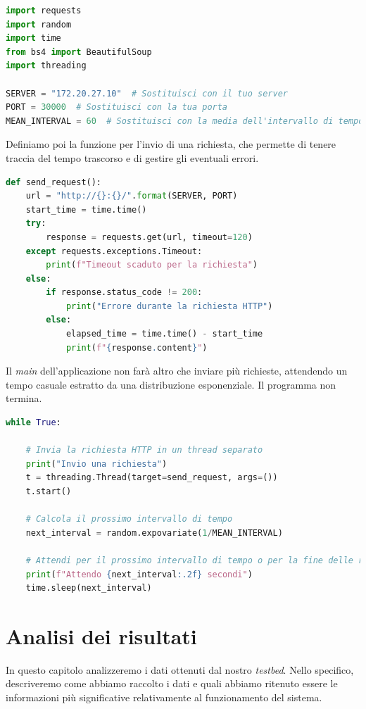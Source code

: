 \documentclass[12pt, hidelinks]{report}
\begin{document}
\begin{lstlisting}[language=Python]
import requests
import random
import time
from bs4 import BeautifulSoup
import threading

SERVER = "172.20.27.10"  # Sostituisci con il tuo server
PORT = 30000  # Sostituisci con la tua porta
MEAN_INTERVAL = 60  # Sostituisci con la media dell'intervallo di tempo tra una richiesta e l'altra
\end{lstlisting}

Definiamo poi la funzione per l'invio di una richiesta, che permette di tenere traccia del tempo trascorso e di gestire gli eventuali errori.

\begin{lstlisting}[language=Python]
def send_request():
    url = "http://{}:{}/".format(SERVER, PORT)
    start_time = time.time()
    try:
        response = requests.get(url, timeout=120)
    except requests.exceptions.Timeout:
        print(f"Timeout scaduto per la richiesta")
    else:
        if response.status_code != 200:
            print("Errore durante la richiesta HTTP")
        else:
            elapsed_time = time.time() - start_time
            print(f"{response.content}")
\end{lstlisting}

Il \textit{main} dell'applicazione non farà altro che inviare più richieste, attendendo un tempo casuale estratto da una distribuzione esponenziale. Il programma non termina.

\begin{lstlisting}[language=Python]
while True:
    
    # Invia la richiesta HTTP in un thread separato
    print("Invio una richiesta")
    t = threading.Thread(target=send_request, args=())
    t.start()

    # Calcola il prossimo intervallo di tempo
    next_interval = random.expovariate(1/MEAN_INTERVAL)

    # Attendi per il prossimo intervallo di tempo o per la fine delle richieste in corso
    print(f"Attendo {next_interval:.2f} secondi")
    time.sleep(next_interval)
\end{lstlisting}

\chapter{Analisi dei risultati}

In questo capitolo analizzeremo i dati ottenuti dal nostro \textit{testbed}. Nello specifico, descriveremo come abbiamo raccolto i dati e quali abbiamo ritenuto essere le informazioni più significative relativamente al funzionamento del sistema.
\end{document}

